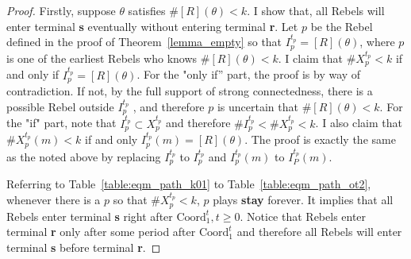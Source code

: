 \documentclass[12pt,letter]{article}
\newcommand{\Kappa}{\mathrm{Coord}}
\theoremstyle{definition}
\theoremstyle{remark}
\theoremstyle{claim}
\begin{document}
\begin{proof}
Firstly, suppose $\theta$ satisfies $\#[R](\theta)<k$. I show that, all Rebels will enter terminal \textbf{s} eventually without entering terminal \textbf{r}.  Let $p$ be the Rebel defined in the proof of Theorem~\ref{lemma_empty} so that $I^{t_p}_p=[R](\theta)$, where $p$ is one of the earliest Rebels who knows $\#[R](\theta)<k$. I claim that $\#X^{t_p}_p< k$ if and only if $I^{t_p}_p=[R](\theta)$. For the "only if'' part, the proof is by way of contradiction. If not, by the full support of strong connectedness, there is a possible Rebel outside $I^{t_p}_p$ , and therefore $p$ is uncertain that $\#[R](\theta)<k$. For the "if" part, note that $I^{t_p}_p\subset X^{t_p}_p$ and therefore $\#I^{t_p}_p< \#X^{t_p}_p<k$. I also claim that $\#X^{t_p}_p(m)<k$ if and only $I^{t_p}_p(m)=[R](\theta)$. The proof is exactly the same as the noted above by replacing $I^{t_p}_p$ to $I^{t_p}_p$ and $I^{t_p}_p(m)$ to $I^{t_p}_P(m)$.

Referring to Table~\ref{table:eqm_path_k01} to Table~\ref{table:eqm_path_ot2}, whenever there is a $p$ so that $\#X^{t_p}_p<k$, $p$ plays \textbf{stay} forever. It implies that all Rebels enter terminal \textbf{s} right after $\Kappa^t_1, t\geq 0$. Notice that Rebels enter terminal \textbf{r} only after some period after $\Kappa^t_1$ and therefore all Rebels will enter terminal \textbf{s} before terminal \textbf{r}. 


\end{proof}
\end{document}
